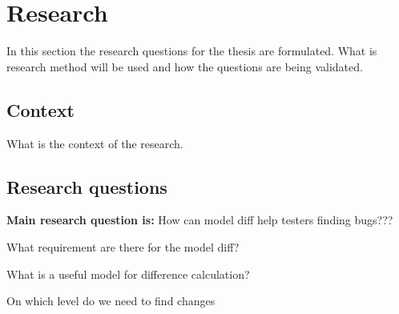 \section{Research} \label{questions}
    In this section the research questions for the thesis are formulated. What is research method will be used and how the questions are being validated.

    \subsection{Context}
    What is the context of the research. 
    
    
    

    \subsection{Research questions}
        
        \textbf{Main research question is:} How can model diff help testers finding bugs???
        
        
      
        
        \begin{questions}
            \item What requirement are there for the model diff?
            \begin{questions}
                \item What is a useful model for difference calculation?
            \end{questions}
            \item On which level do we need to find changes \label{rq:model-change-level}
        \end{questions}
        
